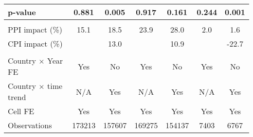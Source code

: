 {\begin{tabular}{l*{6}{c}}
\hspace{15pt} p-value&       0.881         &       0.005         &       0.917         &       0.161         &       0.244         &       0.001         \\
\hline \\ PPI impact (\%)&        15.1         &        18.5         &        23.9         &        28.0         &         2.0         &         1.6         \\
CPI impact (\%)     &                     &        13.0         &                     &        10.9         &                     &       -22.7         \\
\hline \\  Country $\times$ Year FE&         Yes         &          No         &         Yes         &          No         &         Yes         &          No         \\
Country $\times$ time trend&         N/A         &         Yes         &         N/A         &         Yes         &         N/A         &         Yes         \\
Cell FE             &         Yes         &         Yes         &         Yes         &         Yes         &         Yes         &         Yes         \\
Observations        &      173213         &      157607         &      169275         &      154137         &        7403         &        6767         \\
\hline\hline
\end{tabular}
}
